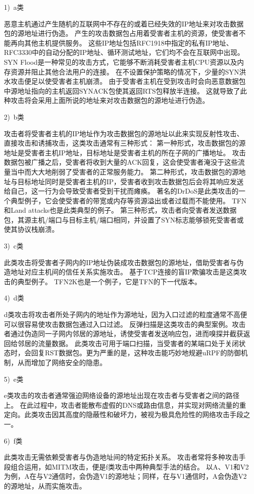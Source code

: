1)~a类\par
恶意主机通过产生随机的互联网中不存在的或着已经失效的IP地址来对攻击数据包的源地址进行伪造。
产生的攻击数据包占用着受害者主机的资源，使受害者不能再向其他主机提供服务。
这些IP地址包括RFC1918中指定的私有IP地址\cite{Rekhter1996}、RFC3330中的自动分配的IP地址\cite{BogonList2003}、循环测试地址，它们均不会在互联网中出现。
SYN Flood是一种常见的攻击方式，它能够不断消耗受害者主机CPU资源以及内存资源并阻止其他合法用户的连接。
在不设置保护策略的情况下，少量的SYN洪水攻击便足以使受害者主机崩溃。
由于受害者主机在受到攻击时会向恶意数据包中源地址指向的主机返回SYNACK包使其返回RTS包释放半连接。
这就导致了此种攻击将会采用上面所说的地址来对攻击数据包的源地址进行伪造。\par
2)~b类\par
攻击者将受害者主机的IP地址作为攻击数据包的源地址以此来实现反射性攻击、直接攻击和诱捕攻击，这类攻击通常有三种形式：
第一种形式，攻击数据包的源地址是受害者主机IP地址，目标地址是受害者主机的所在子网的广播地址。
攻击数据包被广播之后，受害者将收到大量的ACK回复，这会使受害者淹没于这些流量当中而大大地削弱了受害者的正常服务能力。
第二种形式，攻击数据包的源地址与目标地址同时是受害者主机的IP，受害者收到攻击数据包后会将其响应发送给自己，这一行为会导致受害者受到干扰而瘫痪。
著名的DrDoS\cite{Gibson2002}是此类攻击的一个典型例子，它会使受害者的带宽或内存等资源溢出或者过载而不能使用。
TFN\cite{Dittrich1999}和Land  attacks\cite{CERT1997}也是此类典型的例子。
第三种形式，攻击者向受害者发送数据包，其源主机/端口与目标主机/端口相同，并设置了SYN标志能够锁死受害者或使其协议栈崩溃。\par
3)~c类\par
此类攻击将受害者子网内的IP地址伪装成攻击数据包的源地址，借助受害者与伪造地址对应主机间的信任关系实施攻击。
基于TCP连接的盲IP欺骗攻击\cite{Ali2007}是这类攻击的典型例子。
TFN2K\cite{Barlow2000}也是一个例子，它是TFN\cite{Dittrich1999}的下一代版本。\par
4)~d类\par
d类攻击将攻击者所处子网内的地址作为源地址，因为入口过滤的粒度通常不高便可以很容易使攻击数据包通过入口过滤。
反弹扫描\cite{CERT1997}是这类攻击的典型案例。攻击者通过伪造同一子网内邻居的源地址，诱使受害者发送响应包，进而嗅探并截获返回给邻居的流量数据。
此类攻击可用于端口扫描，当受害者的某端口处于关闭状态时，会回复RST数据包\cite{Ray1981}。更为严重的是，这种攻击能巧妙地规避uRPF的防御机制\cite{CiscoIOS2005}，从而增加了网络安全的隐患。\par
5)~e类\par
e类攻击的攻击者通常强迫网络设备的源地址出现在攻击者与受害者之间的路径上。
在此过程中，攻击者能散布虚假的DNS或路由信息，并实现对网络流量的重定向\cite{Huang2006}。此类攻击因其高度的隐蔽性和破坏力，被视为极具危险性的网络攻击手段之一。\par
6)~f类\par
此类攻击无需依赖受害者与伪造地址间的特定拓扑关系。
攻击者常将多种攻击手段组合运用，如MITM攻击\cite{ManInTheMiddle2007}，便是f类攻击中两种典型手法的结合。
以A、V1和V2为例，A在与V2通信时，会伪造V1的源地址；同样，在与V1通信时，A会伪造V2的源地址，从而实施攻击。\par

